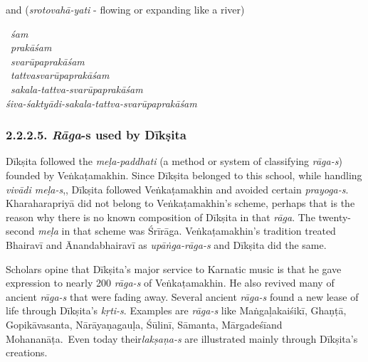 and (\textit{srotovahā-yati} - flowing or expanding like a river)

\vspace{-.45cm}

\begin{myquote}
\begin{center}
~\hspace{4.91cm}\textit{śam}\\ 
~\hspace{4.21cm}\textit{prakāśam}\\ 
~\hspace{3.27cm}\textit{svarūpaprakāśam}\\ 
~\hspace{2.55cm}\textit{tattvasvarūpaprakāśam}\\ 
~\hspace{1.59cm}\textit{sakala-tattva-svarūpaprakāśam}\\ 
\textit{śiva-śaktyādi-sakala-tattva-svarūpaprakāśam}
\end{center}
\end{myquote}


\vspace{-.43cm}

\subsubsection*{2.2.2.5. \textit{Rāga}-s used by Dīkṣita}

\vspace{-.2cm}

Dīkṣita followed the \textit{meḷa-paddhati} (a method or system of classifying \textit{rāga-s}) founded by Veṅkaṭamakhin. Since Dīkṣita belonged to this school, while handling \textit{vivādi meḷa-s},, Dīkṣita followed Veṅkaṭamakhin and avoided certain \textit{prayoga-s}. Kharaharapriyā did not belong to Veṅkaṭamakhin’s scheme, perhaps that is the reason why there is no known composition of Dīkṣita in that \textit{rāga}. The twenty-second \textit{meḷa} in that scheme was Śrīrāga. Veṅkaṭamakhin’s tradition treated Bhairavī and Ānandabhairavī as \textit{upāṅga-rāga-s} and Dīkṣita did the same.

Scholars opine that Dīkṣita’s major service to Karnatic music is that he gave expression to nearly 200 \textit{rāga-s} of Veṅkaṭamakhin. He also revived many of ancient \textit{rāga-s} that were fading away. Several ancient \textit{rāga-s} found a new lease of life through Dīkṣita’s \textit{kṛti-s}. Examples are \textit{rāga-s} like Maṅgaḷakaiśikī, Ghaṇṭā, Gopikāvasanta, Nārāyaṇagauḷa, Śūlinī, Sāmanta, Mārgadeśīand Mohananāṭa.~Even today their\break \textit{lakṣaṇa-s} are illustrated mainly through Dīkṣita’s creations.

